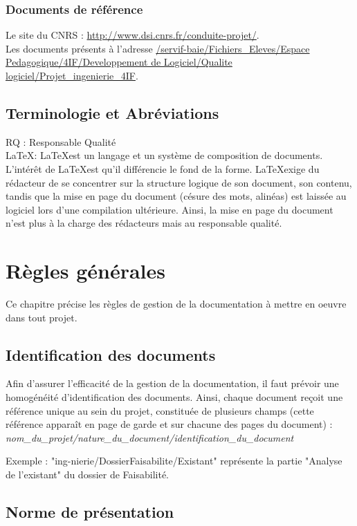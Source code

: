     \subsubsection{Documents de référence}
      Le site du CNRS : \url{http://www.dsi.cnrs.fr/conduite-projet/}.\\
      Les documents présents à l'adresse \url{/servif-baie/Fichiers_Eleves/Espace Pedagogique/4IF/Developpement de Logiciel/Qualite logiciel/Projet_ingenierie_4IF}.
  \subsection{Terminologie et Abréviations}
  RQ : Responsable Qualité \\
  \LaTeX : \LaTeX est un langage et un système de composition de documents. L'intérêt de \LaTeX est qu'il différencie le fond de la forme.
            \LaTeX exige du rédacteur de se concentrer sur la structure logique de son document, son contenu, tandis que la mise en page du document (césure des mots, alinéas) est laissée au logiciel lors d'une compilation ultérieure.
            Ainsi, la mise en page du document n'est plus à la charge des rédacteurs mais au responsable qualité.
             
\section{Règles générales}
Ce chapitre précise les règles de gestion de la documentation à mettre en oeuvre dans tout projet.
  \subsection{Identification des documents}
  Afin d’assurer l’efficacité de la gestion de la documentation, il faut prévoir une homogénéité d’identification des documents.
Ainsi, chaque document reçoit une référence unique au sein du projet, constituée de plusieurs champs (cette référence apparaît en page de garde et sur chacune des pages du document) :
\textit{nom\_du\_projet/nature\_du\_document/identification\_du\_document}

\par Exemple : "ing-nierie/DossierFaisabilite/Existant" représente la partie "Analyse de l'existant" du dossier de Faisabilité.

  \subsection{Norme de présentation}
